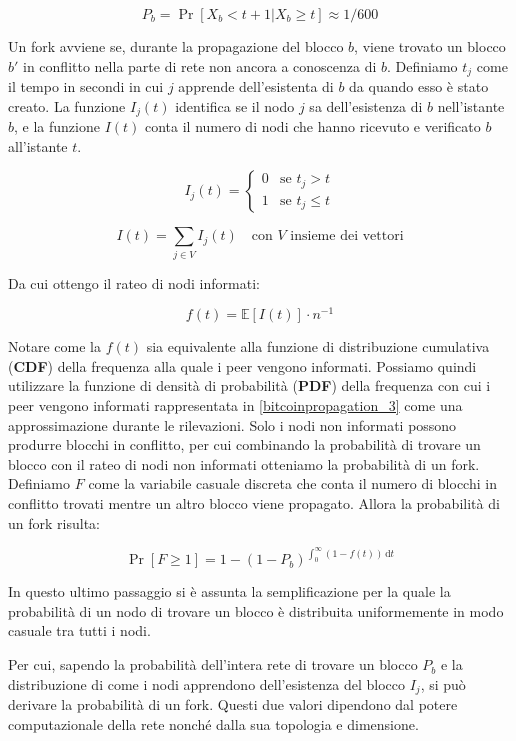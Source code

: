 \[ P_b = \Pr\left[ X_b < t + 1 | X_b \geq t\right] \approx 1/600 \]

Un fork avviene se, durante la propagazione del blocco $b$, viene trovato un blocco $b'$ in conflitto nella parte di rete non ancora a conoscenza di $b$. Definiamo $t_j$ come il tempo in secondi in cui $j$ apprende dell'esistenta di $b$ da quando esso è stato creato. La funzione $I_{j}(t)$ identifica se il nodo $j$ sa dell'esistenza di $b$ nell'istante $b$, e la funzione $I(t)$ conta il numero di nodi che hanno ricevuto e verificato $b$ all'istante $t$.

\[ I_{j}(t) = \begin{cases}
    0 &\textrm{se } t_j > t \\
    1 &\textrm{se } t_j \leq t
\end{cases}\]

\[ I(t) = \sum_{j \in V} I_{j}(t) \quad  \textrm{con }V\textrm{ insieme dei vettori} \]

Da cui ottengo il rateo di nodi informati:

\[ f(t) = \mathbb{E}[I(t)] \cdot n^{-1} \]

Notare come la $f(t)$ sia equivalente alla funzione di distribuzione cumulativa (\textbf{CDF}) della frequenza alla quale i peer vengono informati. Possiamo quindi utilizzare la funzione di densità di probabilità (\textbf{PDF}) della frequenza con cui i peer vengono informati rappresentata in \ref{bitcoinpropagation_3} come una approssimazione durante le rilevazioni. Solo i nodi non informati possono produrre blocchi in conflitto, per cui combinando la probabilità di trovare un blocco con il rateo di nodi non informati otteniamo la probabilità di un fork. Definiamo $F$ come la variabile casuale discreta che conta il numero di blocchi in conflitto trovati mentre un altro blocco viene propagato. Allora la probabilità di un fork risulta:

\[ \Pr\left[F \geq 1\right] = 1 - (1 - P_b)^{\int_{0}^{\infty} \! (1 - f(t)) \, \mathrm{d} t} \]

In questo ultimo passaggio si è assunta la semplificazione per la quale la probabilità di un nodo di trovare un blocco è distribuita uniformemente in modo casuale tra tutti i nodi.

Per cui, sapendo la probabilità dell'intera rete di trovare un blocco $P_b$ e la distribuzione di come i nodi apprendono dell'esistenza del blocco $I_j$, si può derivare la probabilità di un fork. Questi due valori dipendono dal potere computazionale della rete nonché dalla sua topologia e dimensione.

